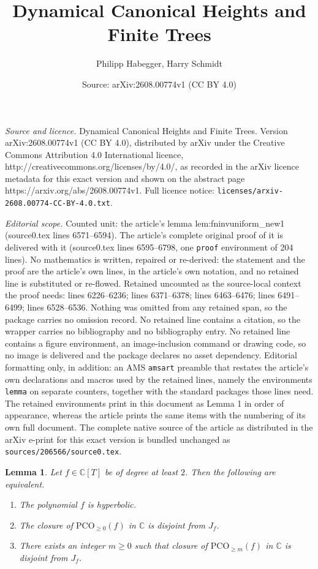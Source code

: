\documentclass[10pt,a4paper]{amsart}
\title{Dynamical Canonical Heights and Finite Trees}
\author{Philipp Habegger, Harry Schmidt}
\date{Source: arXiv:2608.00774v1 (CC BY 4.0)}
\newtheorem{lemma}{Lemma}
\newcommand{\IC}{\mathbb{C}}
\newcommand{\pco}{\mathrm{PCO}}
\begin{document}
\maketitle

\noindent\emph{Source and licence.} Dynamical Canonical Heights and Finite Trees. Version arXiv:2608.00774v1 (CC BY 4.0), distributed by arXiv under the Creative Commons Attribution 4.0 International licence, http://creativecommons.org/licenses/by/4.0/, as recorded in the arXiv licence metadata for this exact version and shown on the abstract page https://arxiv.org/abs/2608.00774v1. Full licence notice: \texttt{licenses/arxiv-2608.00774-CC-BY-4.0.txt}.\par\smallskip

\noindent\textit{Editorial scope.} Counted unit: the article's lemma lem:fninvuniform\_new1 (source0.tex lines 6571--6594). The article's complete original proof of it is delivered with it (source0.tex lines 6595--6798, one \texttt{proof} environment of 204 lines). No mathematics is written, repaired or re-derived: the statement and the proof are the article's own lines, in the article's own notation, and no retained line is substituted or re-flowed.  Retained uncounted as the source-local context the proof needs: lines 6226--6236; lines 6371--6378; lines 6463--6476; lines 6491--6499; lines 6528--6536.  Nothing was omitted from any retained span, so the package carries no omission record.  No retained line contains a citation, so the wrapper carries no bibliography and no bibliography entry.  No retained line contains a figure environment, an image-inclusion command or drawing code, so no image is delivered and the package declares no asset dependency.  Editorial formatting only, in addition: an AMS \texttt{amsart} preamble that restates the article's own declarations and macros used by the retained lines, namely the environments \texttt{lemma} on separate counters, together with the standard packages those lines need.  The retained environments print in this document as Lemma 1 in order of appearance, whereas the article prints the same items with the numbering of its own full document.  The complete native source of the article as distributed in the arXiv e-print for this exact version is bundled unchanged as \texttt{sources/206566/source0.tex}.
\begin{lemma}
  \label{lem:hyperboliccharacterization}
  Let $f\in\IC[T]$ be of degree at least $2$.  Then the following are
  equivalent.
  \begin{enumerate}
  \item [(i)] The polynomial $f$ is hyperbolic.
  \item[(ii)] The closure of $\pco_{\ge 0}(f)$ in $\IC$ is disjoint from $J_f$.
  \item[(iii)] There exists an integer $m\ge 0$ such that
    closure of $\pco_{\ge m}(f)$ in $\IC$ is disjoint from $J_f$.
  \end{enumerate}
\end{lemma}
\end{document}
